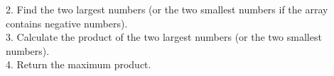\documentclass[preview]{standalone}
\begin{document}
2. Find the two largest numbers (or the two smallest numbers if the array contains negative numbers).\\3. Calculate the product of the two largest numbers (or the two smallest numbers).\\4. Return the maximum product.\\
\end{document}
